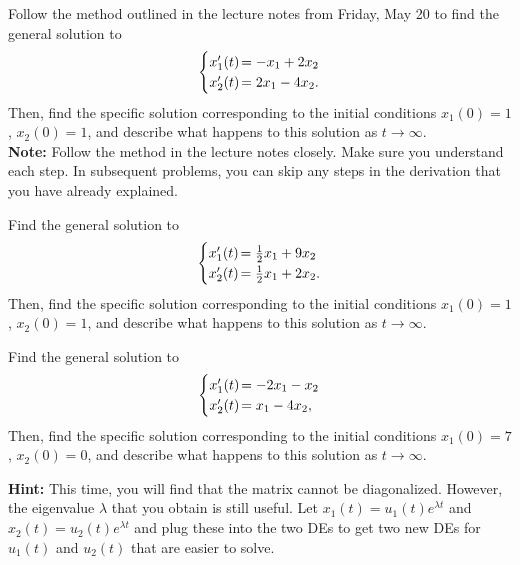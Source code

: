 \documentclass[boxes]{gsypset}
\begin{document}
\begin{problem}
	Follow the method outlined in the lecture notes from Friday, May 20 to find the general solution to
	\[
		\begin{cases}
			x_1'(t)&\hspace{-.12in}=-x_1+2x_2\\
			x_2'(t)&\hspace{-.12in}=2x_1-4x_2.
		\end{cases}
	\]
	Then, find the specific solution corresponding to the initial
	conditions $x_1(0)=1$, $x_2(0)=1$, and describe what happens to this
	solution as $t\to\infty$.\\
	
	\textbf{Note:} Follow the method in the lecture notes closely. 
	Make sure you understand each step. 
	In subsequent problems, you can skip any steps in the derivation that you have already explained.
\end{problem}
\begin{solution}
	
\end{solution}

\begin{problem}
	Find the general solution to
	\[
		\begin{cases}
			x_1'(t)&\hspace{-.12in}=\frac{1}{2}x_1+9x_2\\
			x_2'(t)&\hspace{-.12in}=\frac{1}{2}x_1+2x_2.
		\end{cases}
	\]
	Then, find the specific solution corresponding to the initial
	conditions $x_1(0)=1$, $x_2(0)=1$, and describe what happens to this
	solution as $t\to\infty$.
\end{problem}
\begin{solution}
	
\end{solution}

\begin{problem}
	Find the general solution to
	\[
		\begin{cases}
			x_1'(t)&\hspace{-.12in}=-2x_1-x_2\\
			x_2'(t)&\hspace{-.12in}=x_1-4x_2, 
		\end{cases}
	\]
	Then, find the specific solution corresponding to the initial
	conditions $x_1(0)=7$, $x_2(0)=0$, and describe what happens to this
	solution as $t\to\infty$.
	
	\textbf{Hint:} This time, you will find that the matrix cannot be diagonalized. 
	However, the eigenvalue $\lambda$ that you obtain is still useful. 
	Let $x_1(t)=u_1(t)e^{\lambda t}$ and $x_2(t)=u_2(t)e^{\lambda t}$ and 
	plug these into the two DEs to get two new DEs for $u_1(t)$ and $u_2(t)$ that are easier to solve.
\end{problem}
\begin{solution}
	
\end{solution}
\end{document}
